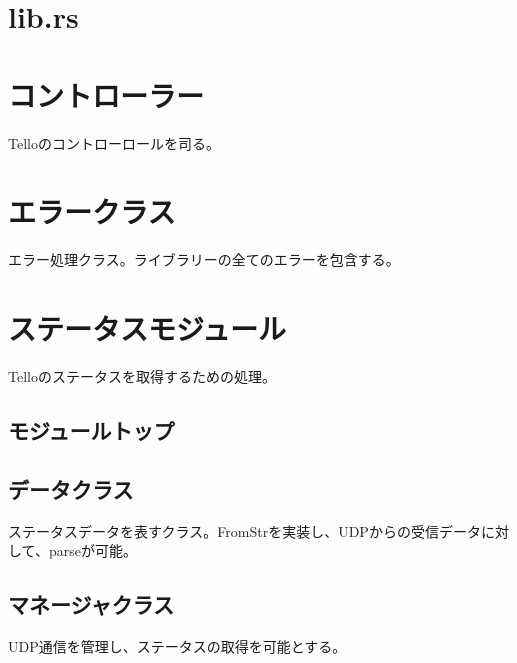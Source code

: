 \documentclass[a4paper, 12pt]{ltjsarticle}
\begin{document}
\section {lib.rs}


\section {コントローラー}
Telloのコントローロールを司る。


\section {エラークラス}
エラー処理クラス。ライブラリーの全てのエラーを包含する。


\section {ステータスモジュール}
Telloのステータスを取得するための処理。
\subsection {モジュールトップ}


\subsection {データクラス}
ステータスデータを表すクラス。FromStrを実装し、UDPからの受信データに対して、parseが可能。


\subsection {マネージャクラス}
UDP通信を管理し、ステータスの取得を可能とする。

\end{document}
